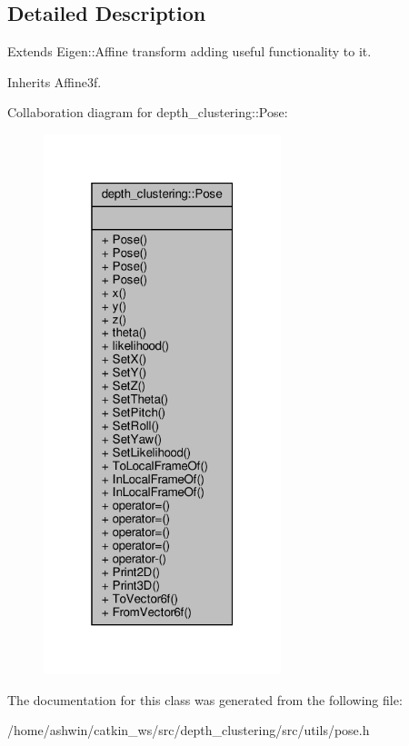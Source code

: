 \subsection{Detailed Description}
Extends Eigen\+::\+Affine transform adding useful functionality to it. 

Inherits Affine3f.



Collaboration diagram for depth\+\_\+clustering\+:\+:Pose\+:\nopagebreak
\begin{figure}[H]
\begin{center}
\leavevmode
\includegraphics[width=196pt]{classdepth__clustering_1_1Pose__coll__graph}
\end{center}
\end{figure}


The documentation for this class was generated from the following file\+:\begin{DoxyCompactItemize}
\item 
/home/ashwin/catkin\+\_\+ws/src/depth\+\_\+clustering/src/utils/pose.\+h\end{DoxyCompactItemize}
